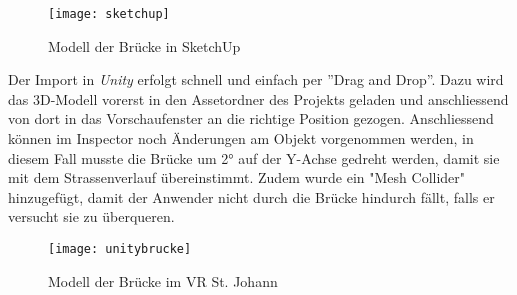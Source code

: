 \begin{figure}[ht]
	\vspace{-20pt}
	\begin{center}
		\texttt{[image: sketchup]}
	\end{center}
	\vspace{-15pt}
	\caption{Modell der Brücke in SketchUp}\label{sketchup}
	\vspace{-12pt}
\end{figure}

\newpage
Der Import in \textit{Unity} erfolgt schnell und einfach per ''Drag and Drop''. Dazu wird das 3D-Modell vorerst in den Assetordner des Projekts geladen und anschliessend von dort in das Vorschaufenster an die richtige Position gezogen. Anschliessend können im Inspector noch Änderungen am Objekt vorgenommen werden, in diesem Fall musste die Brücke um 2° auf der Y-Achse gedreht werden, damit sie mit dem Strassenverlauf übereinstimmt. Zudem wurde ein "Mesh Collider" hinzugefügt, damit der Anwender nicht durch die Brücke hindurch fällt, falls er versucht sie zu überqueren.\\[6pt]
 
 \begin{figure}[ht]
 	\vspace{-20pt}
 	\begin{center}
 		\texttt{[image: unitybrucke]}
 	\end{center}
 	\vspace{-15pt}
 	\caption{Modell der Brücke im VR St. Johann}\label{unitybrücke}
 	\vspace{-12pt}
 \end{figure}

